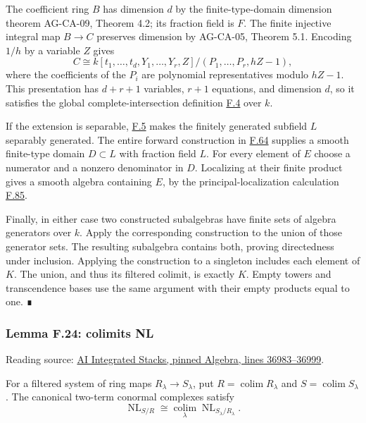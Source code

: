 \documentclass[11pt,a4paper,openany]{report}
\begin{document}
The coefficient ring \(B\) has dimension \(d\) by the finite-type-domain dimension theorem AG-CA-09, Theorem 4.2; its fraction field is \(F\). The finite injective integral map \(B\to C\) preserves dimension by AG-CA-05, Theorem 5.1. Encoding \(1/h\) by a variable \(Z\) gives \[C\cong k[t_1,\ldots,t_d,Y_1,\ldots,Y_r,Z]/
(P_1,\ldots,P_r,hZ-1),\] where the coefficients of the \(P_i\) are polynomial representatives modulo \(hZ-1\). This presentation has \(d+r+1\) variables, \(r+1\) equations, and dimension \(d\), so it satisfies the global complete-intersection definition \hyperref[AG-RG-S05-algebra-definition-relative-global-complete-intersection]{F.4} over \(k\).

If the extension is separable, \hyperref[AG-RG-S05-algebra-definition-separable-field-extension]{F.5} makes the finitely generated subfield \(L\) separably generated. The entire forward construction in \hyperref[AG-RG-S05-algebra-lemma-localization-smooth-separable]{F.64} supplies a smooth finite-type domain \(D\subset L\) with fraction field \(L\). For every element of \(E\) choose a numerator and a nonzero denominator in \(D\). Localizing at their finite product gives a smooth algebra containing \(E\), by the principal-localization calculation \hyperref[AG-RG-S05-algebra-lemma-standard-smooth]{F.85}.

Finally, in either case two constructed subalgebras have finite sets of algebra generators over \(k\). Apply the corresponding construction to the union of those generator sets. The resulting subalgebra contains both, proving directedness under inclusion. Applying the construction to a singleton includes each element of \(K\). The union, and thus its filtered colimit, is exactly \(K\). Empty towers and transcendence bases use the same argument with their empty products equal to one. ∎

\label{AG-RG-S05-algebra-lemma-colimits-NL}

\subsubsection{Lemma F.24: colimits NL}\label{AG-RG-S05-lemma-f.24-colimits-nl}

Reading source: \href{https://github.com/KokunoYumeto/unofficial-stacks-project-ai-drafts/blob/565b10e987aba5969b21145a0833f42d69f96790/algebra.tex\#L36983-L36999}{AI Integrated Stacks, pinned Algebra, lines 36983--36999}.

For a filtered system of ring maps \(R_\lambda\to S_\lambda\), put \(R=\operatorname*{colim}R_\lambda\) and \(S=\operatorname*{colim}S_\lambda\). The canonical two-term conormal complexes satisfy \[\operatorname{NL}_{S/R}\cong
\operatorname*{colim}_\lambda\operatorname{NL}_{S_\lambda/R_\lambda}.\]
\end{document}
